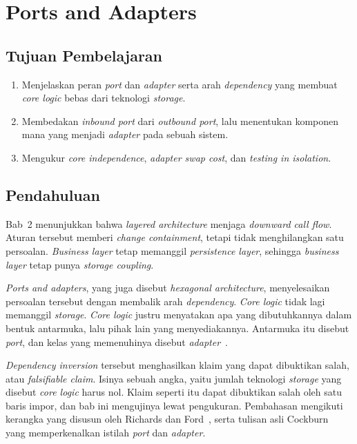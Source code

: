 \chapter{Ports and Adapters}
\label{bab:port}

\section*{Tujuan Pembelajaran}

\begin{enumerate}
  \item Menjelaskan peran \textit{port} dan \textit{adapter} serta arah
    \textit{dependency} yang membuat \textit{core logic} bebas dari teknologi
    \textit{storage}.
  \item Membedakan \textit{inbound port} dari \textit{outbound port}, lalu
    menentukan komponen mana yang menjadi \textit{adapter} pada sebuah sistem.
  \item Mengukur \textit{core independence}, \textit{adapter swap cost}, dan
    \textit{testing in isolation}.
\end{enumerate}

\section{Pendahuluan}

Bab~2 menunjukkan bahwa \textit{layered
architecture} menjaga
\textit{downward
call flow}. Aturan tersebut memberi \textit{change containment}, tetapi tidak
menghilangkan satu persoalan. \textit{Business layer} tetap memanggil
\textit{persistence layer}, sehingga \textit{business layer} tetap punya
\textit{storage coupling}.

\textit{Ports and adapters}, yang
juga disebut \textit{hexagonal
architecture},
menyelesaikan persoalan tersebut dengan membalik arah
\textit{dependency}.
\textit{Core logic} tidak lagi memanggil
\textit{storage}. \textit{Core logic}
justru menyatakan apa yang dibutuhkannya dalam bentuk antarmuka, lalu pihak
lain yang menyediakannya. Antarmuka itu disebut \textit{port},
dan kelas yang
memenuhinya disebut
\textit{adapter}~\cite{cockburn2005hexagonal}.

\textit{Dependency inversion}
tersebut menghasilkan klaim yang dapat dibuktikan
salah, atau \textit{falsifiable
claim}. Isinya sebuah angka, yaitu
jumlah
teknologi \textit{storage} yang disebut \textit{core logic} harus nol. Klaim
seperti itu dapat dibuktikan salah oleh satu baris impor, dan bab ini
mengujinya lewat pengukuran. Pembahasan mengikuti kerangka yang disusun oleh
Richards dan Ford~\cite{richards2020fundamentals}, serta tulisan asli
Cockburn~\cite{cockburn2005hexagonal} yang memperkenalkan istilah \textit{port}
dan \textit{adapter}.

